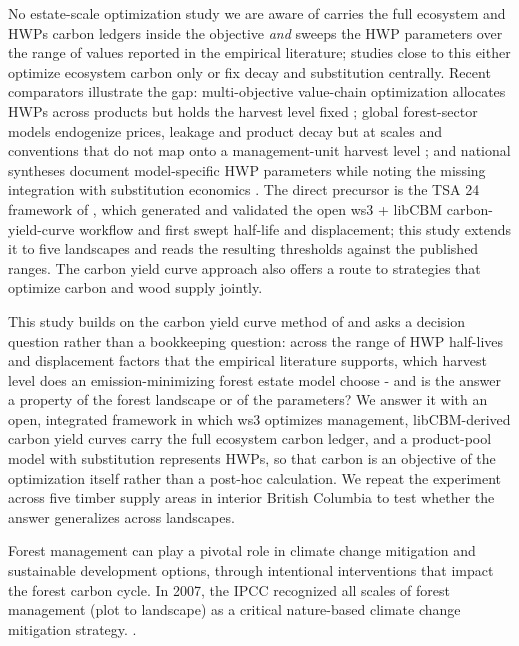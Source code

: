 \documentclass[preprint,12pt,authoryear]{elsarticle}
\begin{document}
\begin{linenumbers}
No estate-scale optimization study we are aware of carries the full ecosystem and \acp{HWP} carbon ledgers inside the objective \emph{and} sweeps the \ac{HWP} parameters over the range of values reported in the empirical literature; studies close to this either optimize ecosystem carbon only or fix decay and substitution centrally. Recent comparators illustrate the gap: multi-objective value-chain optimization allocates \acp{HWP} across products but holds the harvest level fixed \citep{boiger2025optimizing}; global forest-sector models endogenize prices, leakage and product decay but at scales and conventions that do not map onto a management-unit harvest level \citep{daigneault2022future}; and national syntheses document model-specific \ac{HWP} parameters while noting the missing integration with substitution economics \citep{lucey2024synthesis}. The direct precursor is the TSA 24 framework of \cite{yan2025bcforest}, which generated and validated the open \ac{ws3} + libCBM carbon-yield-curve workflow and first swept half-life and displacement; this study extends it to five landscapes and reads the resulting thresholds against the published ranges. The carbon yield curve approach also offers a route to strategies that optimize carbon and wood supply jointly. 

This study builds on the carbon yield curve method of \cite{hennigar2008novel, neilson2008optimal} and asks a decision question rather than a bookkeeping question: across the range of \ac{HWP} half-lives and displacement factors that the empirical literature supports, which harvest level does an emission-minimizing forest estate model choose - and is the answer a property of the forest landscape or of the parameters? We answer it with an open, integrated framework in which \ac{ws3} optimizes management, libCBM-derived carbon yield curves carry the full ecosystem carbon ledger, and a product-pool model with substitution represents \acp{HWP}, so that carbon is an objective of the optimization itself rather than a post-hoc calculation. We repeat the experiment across five timber supply areas in interior British Columbia to test whether the answer generalizes across landscapes.




Forest management can play a pivotal role in climate change mitigation and sustainable development options, through intentional interventions that impact the forest carbon cycle. In 2007, the \ac{IPCC} recognized all scales of forest management (plot to landscape) as a critical nature-based climate change mitigation strategy.  \citep{Nabuurs2007Forestry}. 


\end{linenumbers}
\end{document}
